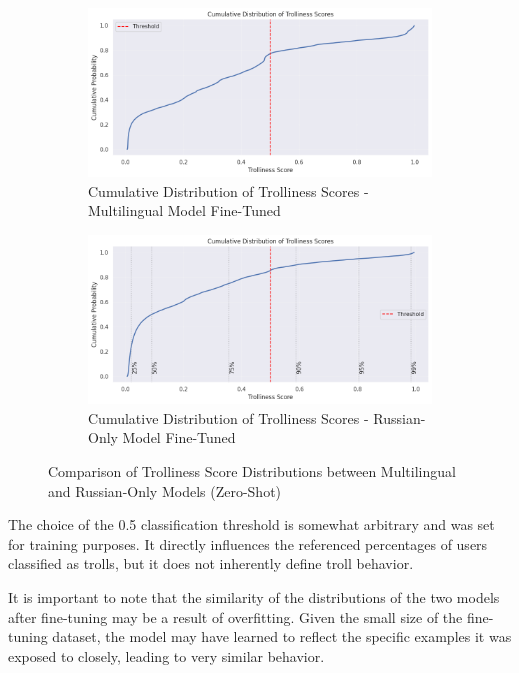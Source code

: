 \documentclass[twoside]{ctuthesis}
\theoremstyle{plain}
\theoremstyle{definition}
\theoremstyle{note}
\begin{document}
\begin{figure}[H]
  \centering
  \begin{subfigure}{0.8\linewidth}
    \centering
    \includegraphics[width=\linewidth]{figures/cumulative_mult.png}
    \caption{Cumulative Distribution of Trolliness Scores - Multilingual Model Fine-Tuned}
    \label{fig:cumulative_mult}
  \end{subfigure}

  \vspace{1em}

  \begin{subfigure}{0.8\linewidth}
    \centering
    \includegraphics[width=\linewidth]{figures/cumulative_ru.png}
    \caption{Cumulative Distribution of Trolliness Scores - Russian-Only Model Fine-Tuned}
    \label{fig:cumulative_ru}
  \end{subfigure}
  \caption{Comparison of Trolliness Score Distributions between Multilingual and Russian-Only Models (Zero-Shot)}
  \label{fig:cumulative_comparison_finetuned}
\end{figure}

The choice of the 0.5 classification threshold is somewhat arbitrary and was set for training purposes. It directly influences the referenced percentages of users classified as trolls, but it does not inherently define troll behavior.\par
It is important to note that the similarity of the distributions of the two models after fine-tuning may be a result of overfitting. Given the small size of the fine-tuning dataset, the model may have learned to reflect the specific examples it was exposed to closely, leading to very similar behavior.\par
\end{document}
